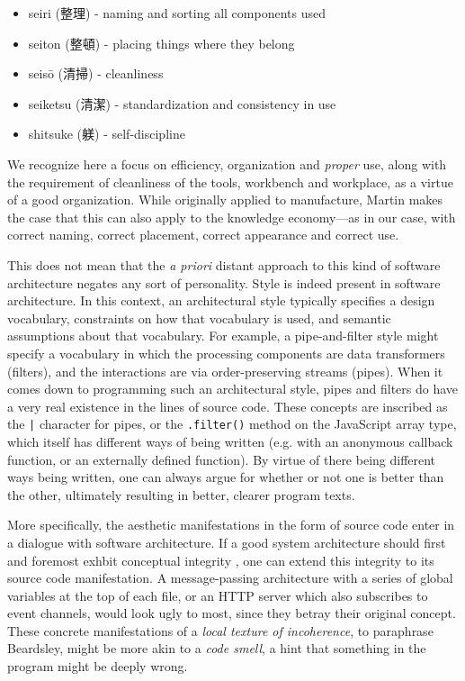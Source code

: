 \begin{itemize}
  \item{seiri (整理) - naming and sorting all components used}
  \item{seiton (整頓) - placing things where they belong}
  \item{seisō (清掃) - cleanliness}
  \item{seiketsu (清潔) - standardization and consistency in use}
  \item{shitsuke (躾) - self-discipline}
\end{itemize}

We recognize here a focus on efficiency, organization and \emph{proper} use, along with the requirement of cleanliness of the tools, workbench and workplace, as a virtue of a good organization. While originally applied to manufacture, Martin makes the case that this can also apply to the knowledge economy—as in our case, with correct naming, correct placement, correct appearance and correct use.

This does not mean that the \emph{a priori} distant approach to this kind of software architecture negates any sort of personality. Style is indeed present in software architecture. In this context, an architectural style typically specifies a design vocabulary, constraints on how that vocabulary is used, and semantic assumptions about that vocabulary. For example, a pipe-and-filter style might specify a vocabulary in which the processing components are data transformers (filters), and the interactions are via order-preserving streams (pipes). When it comes down to programming such an architectural style, pipes and filters do have a very real existence in the lines of source code. These concepts are inscribed as the \lstinline{|} character for pipes, or the \lstinline{.filter()} method on the JavaScript array type, which itself has different ways of being written (e.g. with an anonymous callback function, or an externally defined function). By virtue of there being different ways being written, one can always argue for whether or not one is better than the other, ultimately resulting in better, clearer program texts.

More specifically, the aesthetic manifestations in the form of source code enter in a dialogue with software architecture. If a good system architecture should first and foremost exhbit conceptual integrity \citep{spinellis_beautiful_2009}, one can extend this integrity to its source code manifestation. A message-passing architecture with a series of global variables at the top of each file, or an HTTP server which also subscribes to event channels, would look ugly to most, since they betray their original concept. These concrete manifestations of a \emph{local texture of incoherence}, to paraphrase Beardsley, might be more akin to a \emph{code smell}, a hint that something in the program might be deeply wrong.


